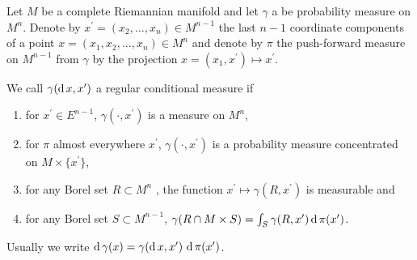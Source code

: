 \begin{defn}
	\label{defn:regular_conditional_measure}
	Let $M$ be a complete Riemannian manifold and
	let $\gamma$ a be probability measure on $M^n$.
	Denote by $x^\prime = (x_2, \ldots, x_n) \in M^{n-1}$ the last $n-1$ coordinate components
	of a point $x = (x_1, x_2, \ldots, x_n) \in M^n$ and
	denote by $\pi$ the push-forward measure on $M^{n-1}$ from $\gamma$ by
	the projection $x = (x_1, x^\prime) \mapsto x^\prime$.

	We call $\gamma(\operatorname{d} x , x^\prime)$ 
	a regular conditional measure if
	\begin{enumerate}
		\item for $x^\prime \in E^{n-1}$, $\gamma(\cdot , x^\prime)$ is a measure on $M^n$,
		\item for $\pi$ almost everywhere $x^\prime$, $\gamma(\cdot, x^\prime)$ is a probability measure
		      concentrated on $M \times \{x^\prime\}$,
		\item for any Borel set $R \subset M^n$ , the function $ x^\prime \mapsto \gamma(R , x^\prime)$ is measurable and
		\item for any Borel set $S \subset M^{n-1}$,
		      $\gamma(R \cap M \times S) = \int_{S} \gamma( R , x^\prime) \operatorname{d} \pi(x^\prime)$.
	\end{enumerate}
	Usually we write
	$ \label{equa:conditional_measure}
		\operatorname{d} \gamma(x) = \gamma(\operatorname{d} x , x^\prime)\, \operatorname{d} \pi(x^\prime) $.
\end{defn}

